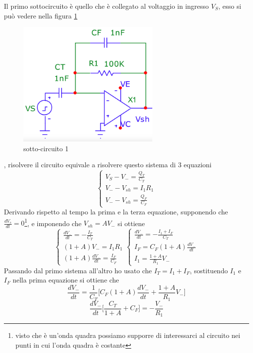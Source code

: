 \documentclass{article}
\begin{document}
		Il primo sottocircuito è quello che è collegato al voltaggio in ingresso $V_S$, esso si può vedere nella figura \ref{fig:circ1}
		\begin{figure}
			\label{fig:circ1}
			\centering
			\includegraphics[width=70mm]{immagini/circ1a.png}
			\caption{sotto-circuito 1}
		\end{figure}
		, risolvere il circuito equivale a risolvere questo sistema di 3 equazioni
		\begin{equation}
			\begin{cases}
				V_S-V_-=\frac{Q_T}{C_T}\\
				V_--V_{sh}=I_1R_1\\
				V_--V_{sh}=\frac{Q_F}{C_F}
			\end{cases}
		\end{equation}
		Derivando rispetto al tempo la prima e la terza equazione, supponendo che $\frac{dV_s}{dt}=0$\footnote{visto che è un'onda quadra possiamo supporre di interessarci al circuito nei punti in cui l'onda quadra è costante}, e imponendo che $V_{sh}=AV_-$ si ottiene
		\[
			\begin{cases}
				\frac{dV_-}{dt}=-\frac{I_T}{C_T}\\
				(1+A)V_-=I_1R_1\\
				(1+A)\frac{dV_-}{dt}=\frac{I_F}{C_F}
			\end{cases}
			\begin{cases}
				\frac{dV_-}{dt}=-\frac{I_1+I_F}{C_T}\\
				I_F=C_F(1+A)\frac{dV_-}{dt}\\
				I_1=\frac{1+A}{R_1}V_-
			\end{cases}
		\]
		Passando dal primo sistema all'altro ho usato che $I_T=I_1+I_F$, sostituendo $I_1$ e $I_F$ nella prima equazione si ottiene che
		\[
			\frac{dV_-}{dt}=\frac{1}{C_T}\bigg[C_F(1+A)\frac{dV_-}{dt}+\frac{1+A}{R_1}V_-\bigg]
		\]
		\[
			\frac{dV_-}{dt}\bigg[\frac{C_T}{1+A}+C_F\bigg]=-\frac{V_-}{R_1}
		\]
\end{document}
